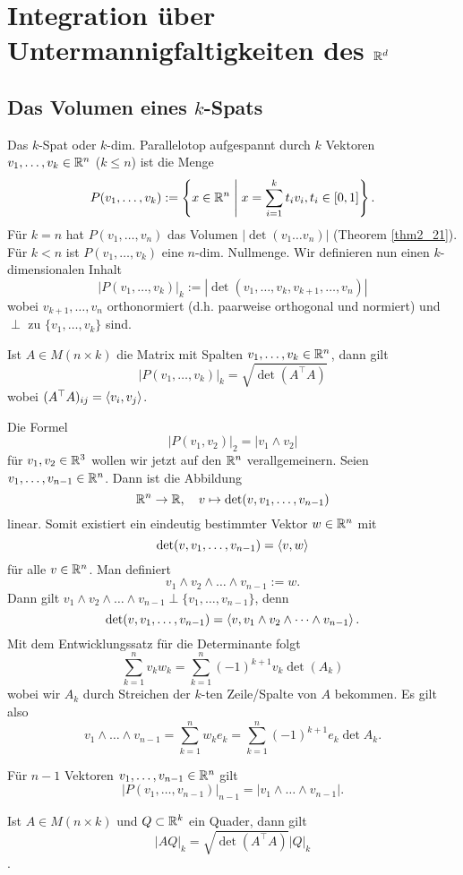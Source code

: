 \section{Integration über Untermannigfaltigkeiten des  $\mathbb{R}^d$}
\subsection{Das Volumen eines $k$-Spats}
Das $k$-Spat oder $k$-dim. Parallelotop aufgespannt durch $k$ Vektoren $v_1, \dots, v_k \in \mathbb{R}^n$ ($k \leq n$) ist die Menge
\[P(v_1, \dots, v_k) := \left\{x \in \mathbb{R}^n \;\Biggr|\; x = \sum_{i=1}^k t_i v_i, t_i \in [0,1]\right\}.\]
Für $k = n$ hat $P(v_1, \dots, v_n)$ das Volumen $|\det(v_1 \dots v_n)|$ (Theorem \ref{thm2_21}). Für $k < n$ ist $P(v_1, \dots, v_k)$ eine $n$-dim. Nullmenge. Wir definieren nun einen $k$-dimensionalen Inhalt
\[|P(v_1, \dots, v_k)|_k := |\det(v_1, \dots, v_k, v_{k+1}, \dots, v_n)|\]
wobei $v_{k+1}, \dots, v_n$ orthonormiert (d.h. paarweise orthogonal und normiert) und $\perp$ zu $\{v_1, \dots, v_k\}$ sind.
\begin{satz}\label{satz3_1}
	Ist $A \in M(n \times k)$ die Matrix mit Spalten $v_1, \dots, v_k \in \mathbb{R}^n$, dann gilt
	\[|P(v_1, \dots, v_k)|_k = \sqrt{\det(A^\top A)}\]
	wobei $(A^\top A)_{ij} = \left\langle v_i,v_j \right\rangle$.
\end{satz}
Die Formel
\[|P(v_1, v_2)|_2 = |v_1 \land v_2|\]
für $v_1, v_2 \in \mathbb{R}^3$ wollen wir jetzt auf den $\mathbb{R}^n$ verallgemeinern. Seien $v_1, \dots, v_{n-1} \in \mathbb{R}^n$. Dann ist die Abbildung 
\[\mathbb{R}^n \to \mathbb{R}, \quad v \mapsto \det(v, v_1, \dots, v_{n-1})\]
linear. Somit existiert ein eindeutig bestimmter Vektor $w \in \mathbb{R}^n$ mit
\[\det(v, v_1, \dots, v_{n-1}) = \left\langle v,w \right\rangle\]
für alle $v \in \mathbb{R}^n$. Man definiert
\[v_1 \land v_2 \land \dots \land v_{n-1} := w.\]
Dann gilt $v_1 \land v_2 \land \dots \land v_{n-1} \perp \{v_1, \dots, v_{n-1}\}$, denn 
\[\det(v, v_1, \dots, v_{n-1}) = \left\langle v,v_1 \land v_2 \land \dots \land v_{n-1} \right\rangle.\]
Mit dem Entwicklungssatz für die Determinante folgt
\[\sum_{k=1}^n v_k w_k = \sum_{k=1}^n (-1)^{k+1} v_k \det(A_k)\]
wobei wir $A_k$ durch Streichen der $k$-ten Zeile/Spalte von $A$ bekommen. Es gilt also
\[v_1 \land \dots \land v_{n-1} = \sum_{k=1}^n w_k e_k = \sum_{k=1}^n (-1)^{k+1} e_k \det A_k.\]
\begin{satz}\label{satz3_2}
	Für $n - 1$ Vektoren $v_1, \dots, v_{n-1} \in \mathbb{R}^n$ gilt
	\[|P(v_1, \dots, v_{n-1})|_{n-1} = |v_1 \wedge \dots \wedge v_{n-1}|.\]
\end{satz}
\begin{kor}\label{kor3_3}
	Ist $A \in M(n\times k)$ und $Q \subset \mathbb{R}^k$ ein Quader, dann gilt
	\[|AQ|_k = \sqrt{\det(A^\top A)} |Q|_k\].
\end{kor}

